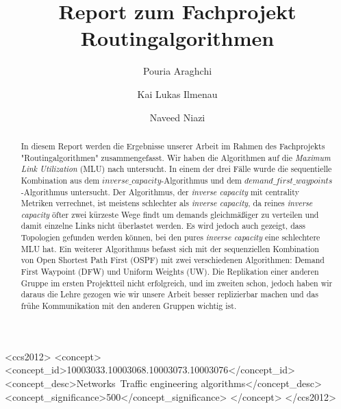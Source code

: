 \documentclass[sigconf, nonacm, review]{acmart}
\begin{document}
\title{Report zum Fachprojekt Routingalgorithmen}
\author{Pouria Araghchi}

\author{Kai Lukas Ilmenau}

\author{Naveed Niazi}

\renewcommand{\shortauthors}{Araghchi, Ilmenau, Niazi}

\begin{abstract}
In diesem Report werden die Ergebnisse unserer Arbeit im Rahmen des Fachprojekts "Routingalgorithmen" zusammengefasst.
Wir haben die Algorithmen auf die \emph{Maximum Link Utilization} (MLU) nach \cite{foerster2021} untersucht.
In einem der drei F\"alle wurde die sequentielle Kombination aus dem $inverse\_capacity$-Algorithmus und dem $demand\_first\_waypoints$-Algorithmus untersucht.
Der Algorithmus, der \emph{inverse capacity} mit centrality Metriken verrechnet, ist meistens schlechter als \emph{inverse capacity}, 
da reines \emph{inverse capacity} \"ofter zwei k\"urzeste Wege findt um demands gleichm\"a\ss iger zu verteilen und damit einzelne Links nicht \"uberlastet werden.
Es wird jedoch auch gezeigt, dass Topologien gefunden werden k\"onnen, bei den pures \emph{inverse capacity} eine schlechtere MLU hat.
Ein weiterer Algorithmus befasst sich mit der sequenziellen Kombination von Open Shortest Path First (OSPF) mit zwei verschiedenen Algorithmen: 
Demand First Waypoint (DFW) und Uniform Weights (UW).
Die Replikation einer anderen Gruppe im ersten Projektteil nicht erfolgreich, und im zweiten schon, 
jedoch haben wir daraus die Lehre gezogen wie wir unsere Arbeit besser replizierbar machen und das fr\"uhe Kommunikation mit den anderen Gruppen wichtig ist.
\end{abstract}

\begin{CCSXML}
<ccs2012>
<concept>
<concept_id>10003033.10003068.10003073.10003076</concept_id>
<concept_desc>Networks~Traffic engineering algorithms</concept_desc>
<concept_significance>500</concept_significance>
</concept>
</ccs2012>
\end{CCSXML}
\end{document}
